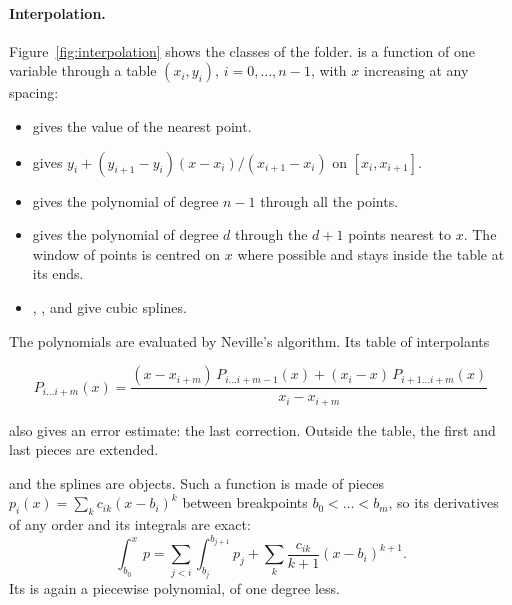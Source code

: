 \paragraph{Interpolation.}
Figure~\ref{fig:interpolation} shows the classes of the folder.
 is a function of one variable through a table $(x_i,y_i)$, $i=0,\dots,n-1$, with $x$
increasing at any spacing:
\begin{itemize}
\item {} gives the value of the nearest point.
\item {} gives $y_i + (y_{i+1}-y_i)(x-x_i)/(x_{i+1}-x_i)$ on $[x_i,x_{i+1}]$.
\item {} gives the polynomial of degree $n-1$ through all the points.
\item {} gives the polynomial of degree $d$ through the $d+1$ points nearest to $x$. The window of
points is centred on $x$ where possible and stays inside the table at its ends.
\item {}, ,  and  give cubic splines.
\end{itemize}
The polynomials are evaluated by Neville's algorithm. Its table of interpolants
\begin{widetext}
\begin{equation}
P_{i\dots i+m}(x)=\frac{(x-x_{i+m})\,P_{i\dots i+m-1}(x)+(x_i-x)\,P_{i+1\dots i+m}(x)}{x_i-x_{i+m}}
\end{equation}
\end{widetext}
also gives an error estimate: the last correction. Outside the table, the first and last pieces are extended.

 and the splines are  objects. Such a function is made of pieces
$p_i(x)=\sum_k c_{ik}(x-b_i)^k$ between breakpoints $b_0<\dots<b_m$, so its derivatives of any order and its
integrals are exact:
\begin{equation}
\int_{b_0}^{x} p = \sum_{j<i}\int_{b_j}^{b_{j+1}}p_j + \sum_k \frac{c_{ik}}{k+1}(x-b_i)^{k+1}.
\end{equation}
Its  is again a piecewise polynomial, of one degree less.

